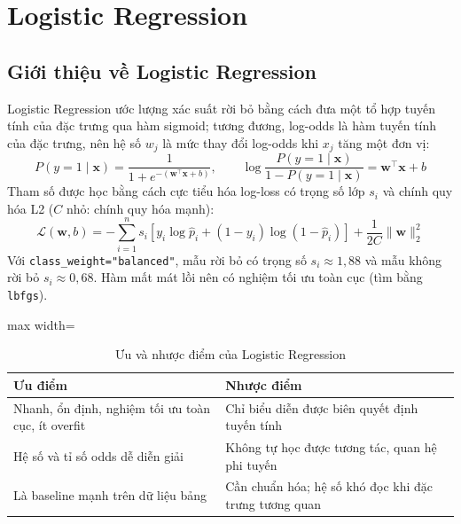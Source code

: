 \section{Logistic Regression}\label{sec:lr}

\subsection{Giới thiệu về Logistic Regression}
Logistic Regression \cite{hosmer2013} ước lượng xác suất rời bỏ bằng cách đưa một tổ hợp tuyến tính của đặc trưng qua hàm sigmoid; tương đương, log-odds là hàm tuyến tính của đặc trưng, nên hệ số $w_j$ là mức thay đổi log-odds khi $x_j$ tăng một đơn vị:
\begin{equation}
    P(y = 1 \mid \mathbf{x}) = \frac{1}{1 + e^{-(\mathbf{w}^\top \mathbf{x} + b)}}, \qquad
    \log \frac{P(y=1 \mid \mathbf{x})}{1 - P(y=1 \mid \mathbf{x})} = \mathbf{w}^\top \mathbf{x} + b
\end{equation}
Tham số được học bằng cách cực tiểu hóa log-loss có trọng số lớp $s_i$ và chính quy hóa L2 ($C$ nhỏ: chính quy hóa mạnh):
\begin{equation}
    \mathcal{L}(\mathbf{w}, b) = -\sum_{i=1}^{n} s_i \left[y_i \log \hat{p}_i + (1-y_i)\log(1-\hat{p}_i)\right] + \frac{1}{2C}\|\mathbf{w}\|_2^2
\end{equation}
Với \texttt{class\_weight="balanced"}, mẫu rời bỏ có trọng số $s_i \approx 1{,}88$ và mẫu không rời bỏ $s_i \approx 0{,}68$. Hàm mất mát lồi nên có nghiệm tối ưu toàn cục (tìm bằng \texttt{lbfgs}).

\begin{table}[H]
\centering
\begin{adjustbox}{max width=\textwidth}
\begin{tabular}{|p{7cm}|p{7cm}|}
\hline
\textbf{Ưu điểm} & \textbf{Nhược điểm} \\
\hline
Nhanh, ổn định, nghiệm tối ưu toàn cục, ít overfit & Chỉ biểu diễn được biên quyết định tuyến tính \\
\hline
Hệ số và tỉ số odds dễ diễn giải & Không tự học được tương tác, quan hệ phi tuyến \\
\hline
Là baseline mạnh trên dữ liệu bảng & Cần chuẩn hóa; hệ số khó đọc khi đặc trưng tương quan \\
\hline
\end{tabular}
\end{adjustbox}
\caption{Ưu và nhược điểm của Logistic Regression}
\end{table}

